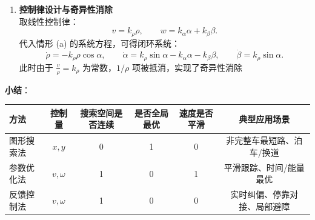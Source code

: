 \documentclass[../main.tex]{subfiles}
\begin{document}
\begin{enumerate}
\begin{itemize}
{\begin{enumerate}
\begin{itemize}
\[\begin{bmatrix}
                                    \end{bmatrix}
                                    \begin{bmatrix}
                                        v \\[2pt] w
                                    \end{bmatrix},
                                    \qquad
                                    \text{在 } \rho = 0 \text{ 处存在奇异性}\footnote{\small\kaishu
                                    奇异性来源于 $\tfrac{\sin\alpha}{\rho}$ 项：当 $\rho \to 0$ 时除零导致方程不可定义，产生数值不稳定；
                                    实际表现为控制器在目标点附近振荡或发散。
                                    为消除奇异性，通常令 $v=k_\rho \rho$，
                                    使得 $\tfrac{v}{\rho}=k_\rho$ 成常数，从而闭环系统不再含 $1/\rho$，在 $\rho \to 0$ 时仍连续可微。}
                                    \]
                                \end{itemize}
                            
                                \item \textbf{控制律设计与奇异性消除}\\
                                取线性控制律：
                                \[
                                v = k_\rho \rho, \qquad w = k_\alpha \alpha + k_\beta \beta.
                                \]
                                代入情形 (a) 的系统方程，可得闭环系统：
                                \[
                                \dot{\rho} = -k_\rho \rho \cos\alpha, \qquad
                                \dot{\alpha} = k_\rho \sin\alpha - k_\alpha \alpha - k_\beta \beta, \qquad
                                \dot{\beta} = k_\rho \sin\alpha.
                                \]
                                此时由于 $\tfrac{v}{\rho}=k_\rho$ 为常数，$1/\rho$ 项被抵消，实现了奇异性消除
                            \end{enumerate}
                            }

                        \end{itemize}
            \end{enumerate}
\textbf{小结}：
\begin{table}[H]
\centering
\small
\begin{tabular}{lccccc}
\toprule
\textbf{方法} & \textbf{控制量} & \textbf{搜索空间是否连续} & \textbf{是否全局最优} & \textbf{速度是否平滑} & \textbf{典型应用场景} \\
\midrule
图形搜索法   & $x,y$      & 0 & 1 & 0 & 非完整车最短路、泊车/换道 \\
参数优化法   & $v,\omega$ & 1 & 0 & 1 & 平滑跟踪、时间/能量最优 \\
反馈控制法   & $v,\omega$ & 1 & 0 & 0 & 实时纠偏、停靠对接、局部避障 \\
\bottomrule
\end{tabular}
\end{table}
\end{document}
